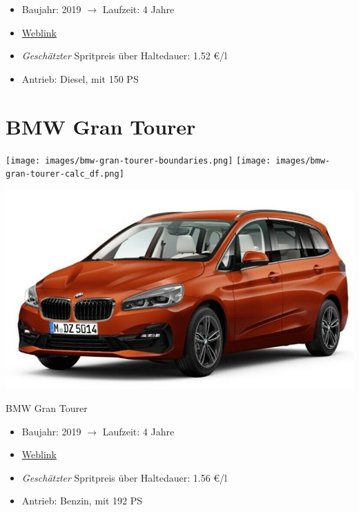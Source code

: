 \documentclass[landscape, DIV=99, 14pt]{scrartcl}
\begin{document}
\begin{itemize}
    \item Baujahr: 2019 $\rightarrow$ Laufzeit: 4 Jahre
    \item \href{https://suchen.mobile.de/fahrzeuge/details.html?id=333524150}{Weblink}
    \item \emph{Gesch\"atzter} Spritpreis \"uber Haltedauer: 1.52 \euro{}/l
    \item Antrieb: Diesel, mit 150 PS
\end{itemize}

\pagebreak


\twocolumn

\section*{BMW Gran Tourer}
\begin{center}
\texttt{[image: images/bmw-gran-tourer-boundaries.png]}
\null
\vspace{0.5cm}
\texttt{[image: images/bmw-gran-tourer-calc\_df.png]}
\end{center}

\pagebreak
\null
\vspace{2cm}
\begin{center}
\includegraphics[width=0.9\columnwidth]{cars/bmw-gran-tourer.png}

BMW Gran Tourer
\end{center}

\begin{itemize}
    \item Baujahr: 2019 $\rightarrow$ Laufzeit: 4 Jahre
    \item \href{https://suchen.mobile.de/fahrzeuge/details.html?id=336851737}{Weblink}
    \item \emph{Gesch\"atzter} Spritpreis \"uber Haltedauer: 1.56 \euro{}/l
    \item Antrieb: Benzin, mit 192 PS
\end{itemize}
\end{document}
